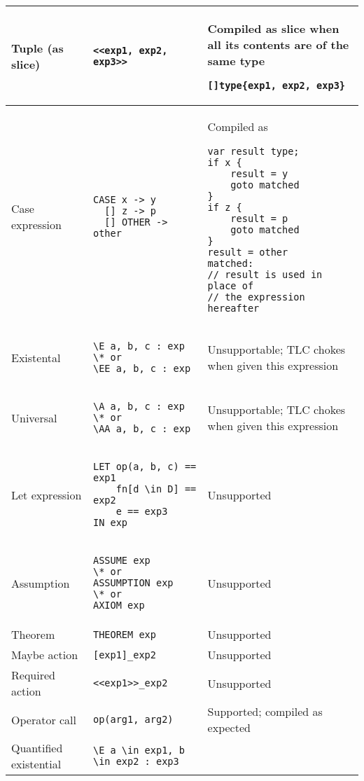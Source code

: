 \begin{center}
\begin{longtable}{ || m{} | m{} | m{} || }
	\hline
	Tuple (as slice) & \lstinline[language=pcal]|<<exp1, exp2, exp3>>| & Compiled as slice when all its contents are of the same type
	\begin{lstlisting}[language=golang]
[]type{exp1, exp2, exp3}
	\end{lstlisting} \\
	\hline
	Case expression &
	\begin{lstlisting}[language=pcal]
CASE x -> y
  [] z -> p
  [] OTHER -> other
	\end{lstlisting} &
	Compiled as
	\begin{lstlisting}[language=golang]
var result type;
if x {
	result = y
	goto matched
}
if z {
	result = p
	goto matched
}
result = other
matched:
// result is used in place of
// the expression hereafter
	\end{lstlisting} \\
	\hline
	Existental &
	\begin{lstlisting}[language=pcal]
\E a, b, c : exp
\* or
\EE a, b, c : exp
	\end{lstlisting} &
	Unsupportable; TLC chokes when given this expression \\
	\hline
	Universal &
	\begin{lstlisting}[language=pcal]
\A a, b, c : exp
\* or
\AA a, b, c : exp
	\end{lstlisting} &
	Unsupportable; TLC chokes when given this expression \\
	\hline
	Let expression &
	\begin{lstlisting}[language=pcal]
LET op(a, b, c) == exp1
    fn[d \in D] == exp2
    e == exp3
IN exp
	\end{lstlisting} &
	Unsupported \\
	\hline
	Assumption &
	\begin{lstlisting}[language=pcal]
ASSUME exp
\* or
ASSUMPTION exp
\* or
AXIOM exp
	\end{lstlisting} &
	Unsupported \\
	\hline
	Theorem & \lstinline[language=pcal]|THEOREM exp| & Unsupported \\
	\hline
	Maybe action & \lstinline[language=pcal]|[exp1]_exp2| &
	Unsupported \\
	\hline
	Required action & \lstinline[language=pcal]|<<exp1>>_exp2| & Unsupported \\
	\hline
	Operator call & \lstinline[language=pcal]|op(arg1, arg2)| & Supported; compiled as expected \\
	\hline
	Quantified existential & \lstinline[language=pcal]|\E a \in exp1, b \in exp2 : exp3| &

\end{longtable}
\end{center}
